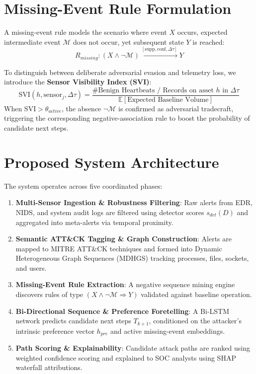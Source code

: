 \documentclass[11pt,a4paper]{article}
\begin{document}
\section{Missing-Event Rule Formulation}
A missing-event rule models the scenario where event $X$ occurs, expected intermediate event $\mathcal{M}$ does not occur, yet subsequent state $Y$ is reached:
\begin{equation}
R_{missing}: (X \wedge \neg \mathcal{M}) \xrightarrow{[\text{supp}, \text{conf}, \Delta \tau]} Y
\end{equation}

To distinguish between deliberate adversarial evasion and telemetry loss, we introduce the \textbf{Sensor Visibility Index (SVI)}:
\begin{equation}
\text{SVI}(h, \text{sensor}_j, \Delta \tau) = \frac{\# \text{Benign Heartbeats / Records on asset } h \text{ in } \Delta \tau}{\mathbb{E}[\text{Expected Baseline Volume}]}
\end{equation}
When $\text{SVI} > \theta_{active}$, the absence $\neg \mathcal{M}$ is confirmed as adversarial tradecraft, triggering the corresponding negative-association rule to boost the probability of candidate next steps.

\section{Proposed System Architecture}
The system operates across five coordinated phases:
\begin{enumerate}
    \item \textbf{Multi-Sensor Ingestion \& Robustness Filtering}: Raw alerts from EDR, NIDS, and system audit logs are filtered using detector scores $s_{det}(D)$ and aggregated into meta-alerts via temporal proximity.
    \item \textbf{Semantic ATT\&CK Tagging \& Graph Construction}: Alerts are mapped to MITRE ATT\&CK techniques and formed into Dynamic Heterogeneous Graph Sequences (MDHGS) tracking processes, files, sockets, and users.
    \item \textbf{Missing-Event Rule Extraction}: A negative sequence mining engine discovers rules of type $(X \wedge \neg \mathcal{M} \Rightarrow Y)$ validated against baseline operation.
    \item \textbf{Bi-Directional Sequence \& Preference Foretelling}: A Bi-LSTM network predicts candidate next steps $T_{k+1}$, conditioned on the attacker's intrinsic preference vector $h_{pre}$ and active missing-event embeddings.
    \item \textbf{Path Scoring \& Explainability}: Candidate attack paths are ranked using weighted confidence scoring and explained to SOC analysts using SHAP waterfall attributions.
\end{enumerate}
\end{document}
